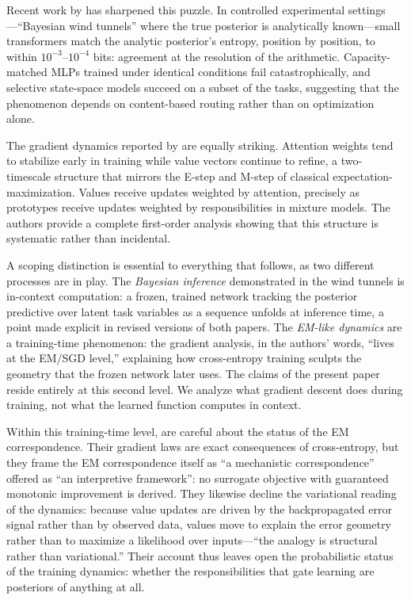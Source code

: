 Recent work by \citet{agarwal2025geometry,agarwal2025gradient} has sharpened this puzzle. In controlled experimental settings---``Bayesian wind tunnels'' where the true posterior is analytically known---small transformers match the analytic posterior's entropy, position by position, to within $10^{-3}$--$10^{-4}$ bits: agreement at the resolution of the arithmetic. Capacity-matched MLPs trained under identical conditions fail catastrophically, and selective state-space models succeed on a subset of the tasks, suggesting that the phenomenon depends on content-based routing rather than on optimization alone.

The gradient dynamics reported by \citet{agarwal2025gradient} are equally striking. Attention weights tend to stabilize early in training while value vectors continue to refine, a two-timescale structure that mirrors the E-step and M-step of classical expectation-maximization. Values receive updates weighted by attention, precisely as prototypes receive updates weighted by responsibilities in mixture models. The authors provide a complete first-order analysis showing that this structure is systematic rather than incidental.

A scoping distinction is essential to everything that follows, as two different processes are in play. The \emph{Bayesian inference} demonstrated in the wind tunnels is in-context computation: a frozen, trained network tracking the posterior predictive over latent task variables as a sequence unfolds at inference time, a point made explicit in revised versions of both papers. The \emph{EM-like dynamics} are a training-time phenomenon: the gradient analysis, in the authors' words, ``lives at the EM/SGD level,'' explaining how cross-entropy training sculpts the geometry that the frozen network later uses. The claims of the present paper reside entirely at this second level. We analyze what gradient descent does during training, not what the learned function computes in context.

Within this training-time level, \citet{agarwal2025gradient} are careful about the status of the EM correspondence. Their gradient laws are exact consequences of cross-entropy, but they frame the EM correspondence itself as ``a mechanistic correspondence'' offered as ``an interpretive framework'': no surrogate objective with guaranteed monotonic improvement is derived. They likewise decline the variational reading of the dynamics: because value updates are driven by the backpropagated error signal rather than by observed data, values move to explain the error geometry rather than to maximize a likelihood over inputs---``the analogy is structural rather than variational.'' Their account thus leaves open the probabilistic status of the training dynamics: whether the responsibilities that gate learning are posteriors of anything at all.

